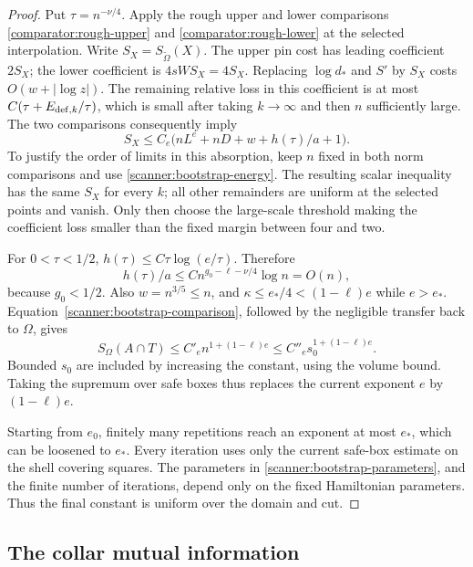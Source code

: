 \begin{proof}
Put \(\tau=n^{-\nu/4}\).  Apply the rough upper and lower
comparisons \eqref{comparator:rough-upper} and
\eqref{comparator:rough-lower} at the selected interpolation.  Write
\(S_X=S_{\widetilde\Omega}(X)\).  The upper pin cost has leading
coefficient \(2S_X\); the lower coefficient is
\(4sWS_X=4S_X\).  Replacing \(\log d_*\) and \(S'\) by \(S_X\)
costs \(O(w+|\log z|)\).  The remaining relative loss in this
coefficient is at most
\(C(\tau+E_{{\rm def},k}/\tau)\), which is small after taking
\(k\to\infty\) and then \(n\) sufficiently large.  The two
comparisons consequently imply
\begin{equation}
 S_X\le C_e\bigl(nL^e+nD+w+h(\tau)/a+1\bigr).
 \label{scanner:bootstrap-comparison}
\end{equation}
To justify the order of limits in this absorption, keep \(n\) fixed
in both norm comparisons and use
\eqref{scanner:bootstrap-energy}.  The resulting scalar inequality
has the same \(S_X\) for every \(k\); all other remainders are
uniform at the selected points and vanish.  Only then choose the
large-scale threshold making the coefficient loss smaller than the
fixed margin between four and two.

For \(0<\tau<1/2\), \(h(\tau)\le C\tau\log(e/\tau)\).  Therefore
\[
 h(\tau)/a
 \le C n^{g_0-\ell-\nu/4}\log n=O(n),
\]
because \(g_0<1/2\).  Also \(w=n^{3/5}\le n\), and
\(\kappa\le e_*/4<(1-\ell)e\) while \(e>e_*\).
Equation~\eqref{scanner:bootstrap-comparison}, followed by the
negligible transfer back to \(\Omega\), gives
\[
 S_\Omega(A\cap T)\le C'_e n^{1+(1-\ell)e}
                       \le C''_e s_0^{1+(1-\ell)e}.
\]
Bounded \(s_0\) are included by increasing the constant, using the
volume bound.  Taking the supremum over safe boxes thus replaces
the current exponent \(e\) by \((1-\ell)e\).

Starting from \(e_0\), finitely many repetitions reach an exponent
at most \(e_*\), which can be loosened to \(e_*\).  Every iteration
uses only the current safe-box estimate on the shell covering squares.
The parameters in \eqref{scanner:bootstrap-parameters}, and the finite
number of iterations, depend only on the fixed Hamiltonian parameters.
Thus the final constant is uniform over the domain and cut.
\end{proof}

\subsection{The collar mutual information}

